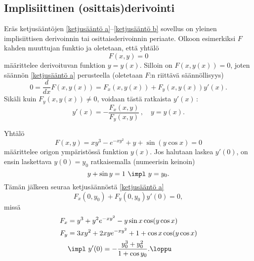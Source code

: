 \subsection{Implisiittinen (osittais)derivointi}

Eräs ketjusääntöjen \eqref{ketjusääntö a}--\eqref{ketjusääntö b} sovellus on yleinen 
implisiittisen derivoinnin tai osittaisderivoinnin periaate. Olkoon esimerkiksi $F$ kahden
muuttujan funktio ja oletetaan, että yhtälö
\[
F(x,y)=0
\]
määrittelee derivoituvan funktion $y=y(x)$. Silloin on $F(x,y(x))=0$, joten säännön 
\eqref{ketjusääntö a} perusteella (oletetaan $F$:n riittävä säännöllisyys)
\[
0 = \frac{d}{dx} F(x,y(x)) = F_x(x,y(x))+F_y(x,y(x))y'(x).
\]
Sikäli kuin $F_y(x,y(x))\neq 0$, voidaan tästä ratkaista $y'(x)\,$:
\[
y'(x)=-\frac{F_x(x,y)}{F_y(x,y)}\,, \quad y=y(x).
\]
\begin{Exa} Yhtälö
\[
F(x,y)=xy^3-e^{-xy^2}+y+\sin(y\cos x)=0
\]
määrittelee origon ympäristössä funktion $y(x)$. Jos halutaan laskea $y'(0)$, on ensin
laskettava $y(0)=y_0$ ratkaisemalla (numeerisin keinoin)
\[
y+\sin y=1 \ \impl \ y=y_0.
\]
Tämän jälkeen seuraa ketjusäännöstä \eqref{ketjusääntö a}
\[
F_x(0,y_0)+F_y(0,y_0)y'(0)=0,
\]
missä
\begin{align*}
F_x &= y^3+y^2e^{-xy^2}-y\sin x\cos (y\cos x) \\
F_y &= 3xy^2+2xye^{-xy^2}+1+\cos x\cos (y\cos x) \\
&\impl \ y'(0)=-\frac{y_0^3+y_0^2}{1+\cos y_0}. \loppu
\end{align*}
\end{Exa}

